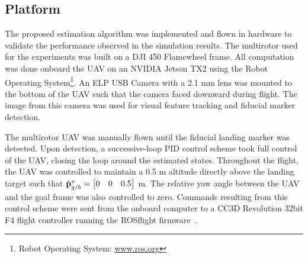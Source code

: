 
\subsection{Platform}
The proposed estimation algorithm was implemented and flown in
hardware to validate the performance observed in the simulation
results. The multirotor used for the experiments was built on a DJI 450 Flamewheel
frame. All computation was done onboard the UAV on an NVIDIA Jetson TX2 using
the Robot Operating System\footnote{Robot Operating System:
\url{www.ros.org}}. An ELP
USB Camera with a 2.1 mm lens was mounted to the bottom of the UAV such that the
camera faced downward during flight. The image from this camera was used for visual
feature tracking and fiducial marker detection.

The multirotor UAV was manually flown until the fiducial landing marker was
detected.
Upon detection, a successive-loop PID control scheme took full control of the
UAV, closing the loop around the
estimated states. Throughout the flight, the UAV was controlled to maintain a
0.5 m altitude directly above the landing target such that $\hat{\mathrm{\mathbf{p}}}_{g/b}^v =
\begin{bmatrix} 0 & 0 & 0.5 \end{bmatrix}$ m.
The relative yaw
angle between the UAV and the goal frame was also controlled to zero.
Commands resulting from this control scheme were sent from
the onboard computer to a CC3D Revolution 32bit F4 flight controller running
the ROSflight firmware~\cite{jackson2016rosflight}.

